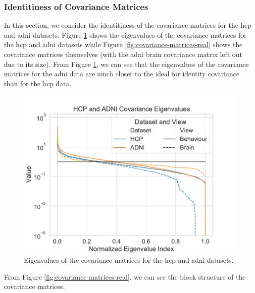 \subsubsection{Identitiness of Covariance Matrices}
In this section, we consider the identitiness of the covariance matrices for the \acrshort{hcp} and \acrshort{adni} datasets.
Figure \ref{fig:covariance-eigenvalues-real} shows the eigenvalues of the covariance matrices for the \acrshort{hcp} and \acrshort{adni} datasets while Figure \ref{fig:covariance-matrices-real} shows the covariance matrices themselves (with the \acrshort{adni} brain covariance matrix left out due to its size).
From Figure \ref{fig:covariance-eigenvalues-real}, we can see that the eigenvalues of the covariance matrices for the \acrshort{adni} data are much closer to the ideal for identity covariance than for the \acrshort{hcp} data.
\begin{figure}
\centering
\includegraphics[width=0.8\linewidth]{figures/covariance/hcp_adni_covariance_eigenvalues}
\caption{Eigenvalues of the covariance matrices for the \acrshort{hcp} and \acrshort{adni} datasets.}\label{fig:covariance-eigenvalues-real}
\end{figure}

From Figure \ref{fig:covariance-matrices-real}, we can see the block structure of the covariance matrices.


